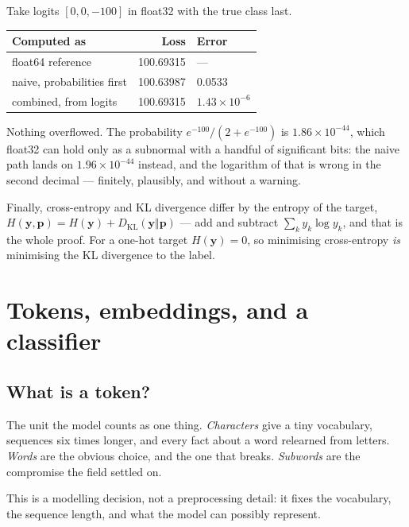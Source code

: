 \documentclass[11pt,a4paper]{article}
\begin{document}
\begin{failbox}[title={Failure condition --- it does not announce itself}]
Take logits $[0, 0, -100]$ in float32 with the true class last.

\begin{center}
\small
\begin{tabular}{lrl}
\toprule
\textbf{Computed as} & \textbf{Loss} & \textbf{Error} \\
\midrule
float64 reference & 100.69315 & --- \\
naive, probabilities first & 100.63987 & 0.0533 \\
combined, from logits & 100.69315 & $1.43\times10^{-6}$ \\
\bottomrule
\end{tabular}
\end{center}

Nothing overflowed. The probability $e^{-100}/(2 + e^{-100})$ is
$1.86\times10^{-44}$, which float32 can hold only as a subnormal with a handful
of significant bits: the naive path lands on $1.96\times10^{-44}$ instead, and
the logarithm of that is wrong in the second decimal --- finitely, plausibly,
and without a warning.
\end{failbox}

Finally, cross-entropy and KL divergence differ by the entropy of the target,
$H(\mathbf{y},\mathbf{p}) = H(\mathbf{y}) + D_{\mathrm{KL}}(\mathbf{y}\Vert
\mathbf{p})$ --- add and subtract $\sum_k y_k\log y_k$, and that is the whole
proof. For a one-hot target $H(\mathbf{y}) = 0$, so minimising cross-entropy
\emph{is} minimising the KL divergence to the label.

\section{Tokens, embeddings, and a classifier}

\subsection{What is a token?}

The unit the model counts as one thing. \emph{Characters} give a tiny
vocabulary, sequences six times longer, and every fact about a word relearned
from letters. \emph{Words} are the obvious choice, and the one that breaks.
\emph{Subwords} are the compromise the field settled on.

This is a modelling decision, not a preprocessing detail: it fixes the
vocabulary, the sequence length, and what the model can possibly represent.
\end{document}
